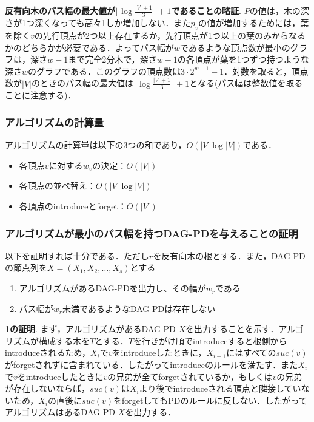 \documentclass{kuisthesis}           %
\begin{document}
 \textbf{反有向木のパス幅の最大値が$\lfloor\log\frac{|V|+1}{3}\rfloor+1$であることの略証}.
 $P$の値は，木の深さが1つ深くなっても高々1しか増加しない．また$p_v$の値が増加するためには，葉を除く$v$の先行頂点が2つ以上存在するか，先行頂点が1つ以上の葉のみからなるかのどちらかが必要である．よってパス幅が$w$であるような頂点数が最小のグラフは，深さ$w-1$まで完全2分木で，深さ$w-1$の各頂点が葉を1つずつ持つような深さ$w$のグラフである．このグラフの頂点数は$3 \cdot2^{w-1}-1$．対数を取ると，頂点数が$|V|$のときのパス幅の最大値は$\lfloor\log\frac{|V|+1}{3}\rfloor+1$となる(パス幅は整数値を取ることに注意する)．

 

 \subsubsection{アルゴリズムの計算量}

 アルゴリズムの計算量は以下の3つの和であり，$O(|V|\log |V|)$である．

 \begin{itemize}
     \item 各頂点$v$に対する$w_v$の決定：$O(|V|)$
     \item 各頂点の並べ替え：$O(|V|\log |V|)$
     \item 各頂点のintroduceとforget：$O(|V|)$
 \end{itemize}
 
 \subsubsection{アルゴリズムが最小のパス幅を持つDAG-PDを与えることの証明}
 以下を証明すれば十分である．ただし$r$を反有向木の根とする．また，DAG-PDの節点列を$X=(X_1, X_2,   \ldots, X_s)$とする
 
 \begin{enumerate}
 \item アルゴリズムがあるDAG-PDを出力し、その幅が$w_r$である
 \item パス幅が$w_r$未満であるようなDAG-PDは存在しない
 \end{enumerate}

 \textbf{1の証明}.
 まず，アルゴリズムがあるDAG-PD $X$を出力することを示す．アルゴリズムが構成する木を$T$とする．$T$を行きがけ順でintroduceすると根側からintroduceされるため，$X_i$で$v$をintroduceしたときに，$X_{i-1}$にはすべての$suc(v)$がforgetされずに含まれている．したがってintroduceのルールを満たす．また$X_i$で$v$をintroduceしたときに$v$の兄弟が全てforgetされているか，もしくは$v$の兄弟が存在しないならば，$suc(v)$は$X_i$より後でintroduceされる頂点と隣接していないため，$X_i$の直後に$suc(v)$をforgetしてもPDのルールに反しない．したがってアルゴリズムはあるDAG-PD $X$を出力する．
 
\end{document}
